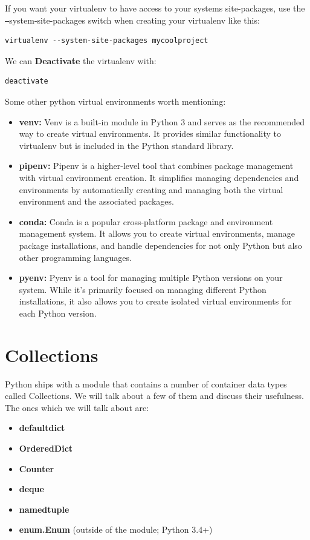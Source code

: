 \documentclass{report}
\begin{document}
    \bigbreak \noindent 
    If you want your virtualenv to have access to your systems site-packages, use the \texttt{--}system-site-packages switch when creating your virtualenv like this:
    \begin{verbatim}
virtualenv --system-site-packages mycoolproject
    \end{verbatim}
    \bigbreak \noindent 
    We can \textbf{Deactivate} the virtualenv with:
    \begin{verbatim}
deactivate
    \end{verbatim}
    \bigbreak \noindent 
    Some other python virtual environments worth mentioning:
    \begin{itemize}
        \item \textbf{venv:} Venv is a built-in module in Python 3 and serves as the recommended way to create virtual environments. It provides similar functionality to virtualenv but is included in the Python standard library.
        \item \textbf{pipenv:} Pipenv is a higher-level tool that combines package management with virtual environment creation. It simplifies managing dependencies and environments by automatically creating and managing both the virtual environment and the associated packages.
        \item \textbf{conda:} Conda is a popular cross-platform package and environment management system. It allows you to create virtual environments, manage package installations, and handle dependencies for not only Python but also other programming languages.
        \item \textbf{pyenv:} Pyenv is a tool for managing multiple Python versions on your system. While it's primarily focused on managing different Python installations, it also allows you to create isolated virtual environments for each Python version.
    \end{itemize}

    \pagebreak \bigbreak \noindent \section{Collections}
    \bigbreak \noindent
    Python ships with a module that contains a number of container data types called Collections. We will talk about a few of them and discuss their usefulness.
    \bigbreak \noindent 
    The ones which we will talk about are:
    \begin{itemize}
        \item \textbf{defaultdict}
        \item \textbf{OrderedDict}
        \item \textbf{Counter}
        \item \textbf{deque}
        \item \textbf{namedtuple}
        \item \textbf{enum.Enum} (outside of the module; Python 3.4+)
    \end{itemize}
\end{document}
